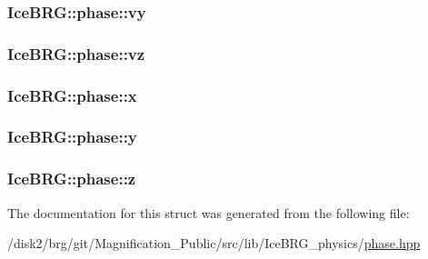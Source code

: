 \subsubsection[{vy}]{ Ice\+B\+R\+G\+::phase\+::vy}\label{structIceBRG_1_1phase_a399932e300cb0d13e15ffac5f71c734d}
\hypertarget{structIceBRG_1_1phase_acacd478d07601c3d8c7edb7d7f1ba6de}{}
\subsubsection[{vz}]{ Ice\+B\+R\+G\+::phase\+::vz}\label{structIceBRG_1_1phase_acacd478d07601c3d8c7edb7d7f1ba6de}
\hypertarget{structIceBRG_1_1phase_ab8b6fb1682a92ccde92c2862e01fe5d2}{}
\subsubsection[{x}]{ Ice\+B\+R\+G\+::phase\+::x}\label{structIceBRG_1_1phase_ab8b6fb1682a92ccde92c2862e01fe5d2}
\hypertarget{structIceBRG_1_1phase_a6c2907eb5f6a5d96368d3901a4e527b0}{}
\subsubsection[{y}]{ Ice\+B\+R\+G\+::phase\+::y}\label{structIceBRG_1_1phase_a6c2907eb5f6a5d96368d3901a4e527b0}
\hypertarget{structIceBRG_1_1phase_aab11405e00390231409ad36f24c18480}{}
\subsubsection[{z}]{ Ice\+B\+R\+G\+::phase\+::z}\label{structIceBRG_1_1phase_aab11405e00390231409ad36f24c18480}


The documentation for this struct was generated from the following file\+:\begin{DoxyCompactItemize}
\item 
/disk2/brg/git/\+Magnification\+\_\+\+Public/src/lib/\+Ice\+B\+R\+G\+\_\+physics/\hyperlink{phase_8hpp}{phase.\+hpp}\end{DoxyCompactItemize}

